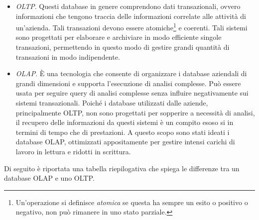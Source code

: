 \begin{itemize}
    \item \textit{OLTP}. Questi database in genere comprendono dati transazionali, ovvero informazioni che tengono traccia delle informazioni correlate alle attività di un’azienda. Tali transazioni devono essere atomiche\footnote{Un'operazione si definisce \textit{atomica} se questa ha sempre un esito o positivo o negativo, non può rimanere in uno stato parziale.} e coerenti. Tali sistemi sono progettati per elaborare e archiviare in modo efficiente singole transazioni, permettendo in questo modo di gestire grandi quantità di transazioni in modo indipendente.\cite{microsoft_oltp}
    \item \textit{OLAP}. È una tecnologia che consente di organizzare i database aziendali di grandi dimensioni e supporta l’esecuzione di analisi complesse. Può essere usata per seguire query di analisi complesse senza influire negativamente sui sistemi transazionali. Poiché i database utilizzati dalle aziende, principalmente OLTP, non sono progettati per sopperire a necessità di analisi, il recupero delle informazioni da questi sistemi è un compito esoso si in termini di tempo che di prestazioni. A questo scopo sono stati ideati i database OLAP, ottimizzati appositamente per gestire intensi carichi di lavoro in lettura e ridotti in scrittura.\cite{microsoft_olap}
\end{itemize}

Di seguito è riportata una tabella riepilogativa che spiega le differenze tra un database OLAP e uno OLTP.\cite{aws_oltp_vs_olap}


